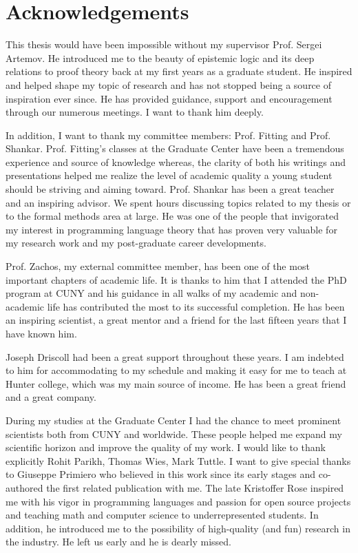 \section*{Acknowledgements}
This thesis would have been impossible without my supervisor Prof. Sergei Artemov.
He introduced me to the beauty of epistemic logic and its deep relations to proof theory
back at my first years as a graduate student. He inspired and helped shape my topic of research and 
has not stopped being a source of inspiration ever
since. He has provided guidance, support and encouragement through our numerous meetings. 
I want to thank him deeply.

In addition, I want to thank my committee members: Prof. Fitting and Prof. Shankar. Prof. Fitting's classes
 at the Graduate Center have been a tremendous experience and source of knowledge whereas,
the clarity of  both his writings and presentations helped me realize the 
level of academic quality a young student should be striving and aiming toward. Prof. Shankar has
been a great teacher and an inspiring advisor. We spent hours 
discussing topics related to my thesis or to the formal methods area at large. He was one
of the people that invigorated my interest in programming language theory that has
proven very valuable for my research work and my post-graduate career developments.

Prof. Zachos, my external committee member, has been one of the most important
chapters of academic life. It is thanks to him that I attended the PhD program at CUNY
and his guidance in all walks of my academic and non-academic life has contributed 
the most  to its successful completion. He has been an inspiring
scientist, a great mentor and a friend for the last fifteen years that I have 
known him. 

Joseph Driscoll had been a great support throughout these 
years. I am indebted to 
him for accommodating to my schedule and making it easy for me to teach at Hunter college,
which was my main source of income. He has been a great friend and a great company.

During my studies at the Graduate Center I had the chance to meet 
prominent scientists both from CUNY and worldwide. 
These people helped me expand my scientific horizon and improve
the quality of my work. I would like to thank explicitly Rohit Parikh, Thomas Wies,  
 Mark Tuttle. I want to give special thanks to Giuseppe Primiero who believed in this work
 since its early stages and co-authored the first related publication with me. 
 The late Kristoffer Rose inspired me with his vigor in programming languages and passion
 for open source projects and teaching math and computer science to underrepresented students. 
 In addition, he introduced me to the possibility of high-quality (and fun) research in the industry. 
 He left us early and he is dearly missed.

